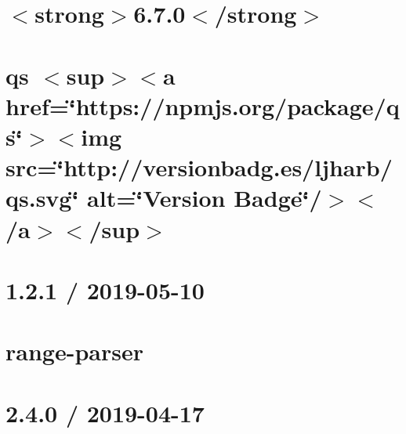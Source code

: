 \let\mypdfximage\pdfximage\def\pdfximage{\immediate\mypdfximage}\documentclass[twoside]{book}
\newcommand{\+}{\discretionary{\mbox{\scriptsize$\hookleftarrow$}}{}{}}
\begin{document}
\chapter{$<$strong$>$6.7.0$<$/strong$>$}
\label{md__c_1__git_hub__p_r_o_y_e_c_t_o-_i_i_i-_g_o_t_rest-api_node_modules_qs__c_h_a_n_g_e_l_o_g}

\chapter{qs $<$sup$>$$<$a href=\char`\"{}https\+://npmjs.\+org/package/qs\char`\"{}$>$$<$img src=\char`\"{}http\+://versionbadg.\+es/ljharb/qs.\+svg\char`\"{} alt=\char`\"{}\+Version Badge\char`\"{}/$>$$<$/a$>$$<$/sup$>$}
\label{md__c_1__git_hub__p_r_o_y_e_c_t_o-_i_i_i-_g_o_t_rest-api_node_modules_qs__r_e_a_d_m_e}

\chapter{1.2.1 / 2019-\/05-\/10}
\label{md__c_1__git_hub__p_r_o_y_e_c_t_o-_i_i_i-_g_o_t_rest-api_node_modules_range-parser__h_i_s_t_o_r_y}

\chapter{range-\/parser}
\label{md__c_1__git_hub__p_r_o_y_e_c_t_o-_i_i_i-_g_o_t_rest-api_node_modules_range-parser__r_e_a_d_m_e}

\chapter{2.4.0 / 2019-\/04-\/17}
\label{md__c_1__git_hub__p_r_o_y_e_c_t_o-_i_i_i-_g_o_t_rest-api_node_modules_raw-body__h_i_s_t_o_r_y}

\end{document}
